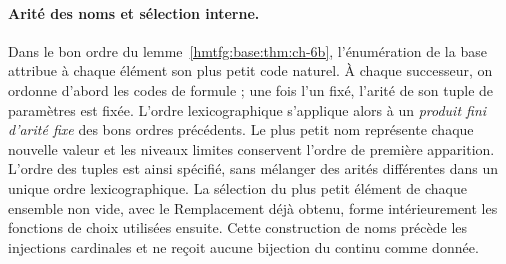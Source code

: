 \paragraph{Arité des noms et sélection interne.}
Dans le bon ordre du lemme~\ref{hmtfg:base:thm:ch-6b}, l’énumération de la base
attribue à chaque élément son plus petit code naturel. À chaque successeur, on ordonne
d’abord les codes de formule ; une fois l’un fixé, l’arité de son
tuple de paramètres est fixée. L’ordre lexicographique s’applique alors à un
\emph{produit fini d’arité fixe} des bons ordres précédents.
Le plus petit nom représente chaque nouvelle valeur et les niveaux limites conservent
l’ordre de première apparition. L’ordre des tuples est ainsi spécifié,
sans mélanger des arités différentes dans un unique ordre
lexicographique. La sélection du plus petit élément de chaque ensemble non vide,
avec le Remplacement déjà obtenu, forme intérieurement les fonctions de
choix utilisées ensuite. Cette construction de noms précède les
injections cardinales et ne reçoit aucune bijection du continu comme
donnée.
